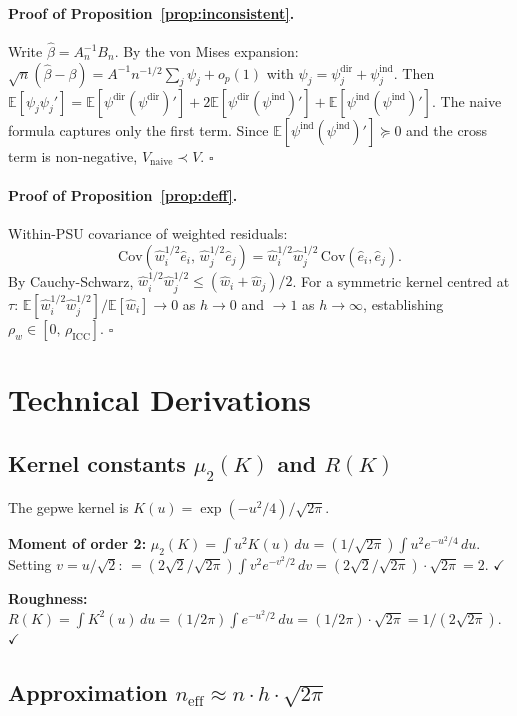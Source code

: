\documentclass[12pt,a4paper]{article}
\theoremstyle{definition}
\newcommand{\E}{\mathbb{E}}
\newcommand{\hbeta}{\hat{\beta}}
\newcommand{\hw}{\hat{w}}
\begin{document}
\paragraph{Proof of Proposition~\ref{prop:inconsistent}.}
Write $\hbeta = A_n^{-1}B_n$. By the von Mises expansion:
$\sqrt{n}(\hbeta-\beta) = A^{-1}n^{-1/2}\sum_j\psi_j + o_p(1)$
with $\psi_j = \psi_j^{\mathrm{dir}}+\psi_j^{\mathrm{ind}}$.
Then $\E[\psi_j\psi_j'] =
\E[\psi^{\mathrm{dir}}(\psi^{\mathrm{dir}})'] +
2\E[\psi^{\mathrm{dir}}(\psi^{\mathrm{ind}})'] +
\E[\psi^{\mathrm{ind}}(\psi^{\mathrm{ind}})']$.
The naive formula captures only the first term.
Since $\E[\psi^{\mathrm{ind}}(\psi^{\mathrm{ind}})'] \succeq 0$
and the cross term is non-negative, $V_{\mathrm{naive}} \prec V$.
$\square$

\paragraph{Proof of Proposition~\ref{prop:deff}.}
Within-PSU covariance of weighted residuals:
\[
\mathrm{Cov}\!\left(\hw_i^{1/2}\hat{e}_i,\,\hw_j^{1/2}\hat{e}_j\right)
= \hw_i^{1/2}\hw_j^{1/2}\,\mathrm{Cov}(\hat{e}_i,\hat{e}_j).
\]
By Cauchy-Schwarz, $\hw_i^{1/2}\hw_j^{1/2}\leq(\hw_i+\hw_j)/2$.
For a symmetric kernel centred at $\tau$:
$\E[\hw_i^{1/2}\hw_j^{1/2}]/\E[\hw_i]\to 0$ as $h\to 0$
and $\to 1$ as $h\to\infty$,
establishing $\rho_w\in[0,\,\rho_{\mathrm{ICC}}]$. $\square$

\section{Technical Derivations}
\label{app:derivations}

\subsection{Kernel constants $\mu_2(K)$ and $R(K)$}
\label{app:deriv_K}

The gepwe kernel is $K(u)=\exp(-u^2/4)/\sqrt{2\pi}$.

\textbf{Moment of order 2:}
$\mu_2(K) = \int u^2 K(u)\,du = (1/\sqrt{2\pi})\int u^2 e^{-u^2/4}\,du$.
Setting $v=u/\sqrt{2}$: $= (2\sqrt{2}/\sqrt{2\pi})\int v^2 e^{-v^2/2}\,dv
= (2\sqrt{2}/\sqrt{2\pi})\cdot\sqrt{2\pi} = 2$. $\checkmark$

\textbf{Roughness:}
$R(K)=\int K^2(u)\,du = (1/2\pi)\int e^{-u^2/2}\,du
= (1/2\pi)\cdot\sqrt{2\pi} = 1/(2\sqrt{2\pi})$. $\checkmark$

\subsection{Approximation $n_{\mathrm{eff}}\approx n\cdot h\cdot\sqrt{2\pi}$}
\label{app:deriv_neff}
\end{document}
